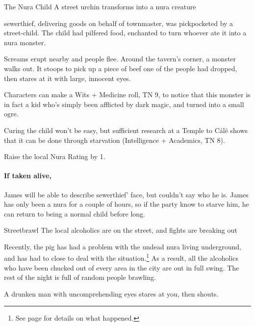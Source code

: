 \begin{multicols}{2}
{\N The Nura Child}%
{A street urchin transforms into a nura creature}%

\Gls{sewerthief}, delivering goods on behalf of \gls{townmaster}, was pickpocketed by a street-child.
The child had pilfered food, enchanted to turn whoever ate it into a nura monster.

\begin{boxtext}

	Screams erupt nearby and people flee.
	Around the tavern's corner, a monster walks out.
	It stoops to pick up a piece of beef one of the people had dropped, then stares at it with large, innocent eyes.

\end{boxtext}

Characters can make a Wits + Medicine roll, TN 9, to notice that this monster is in fact a kid who's simply been afflicted by dark magic, and turned into a small ogre.

Curing the child won't be easy, but sufficient research at a Temple to C\'{a}l\"{e} shows that it can be done through starvation (Intelligence + Academics, TN 8).

Raise the local Nura Rating by 1.


\paragraph{If taken alive,}
James will be able to describe \gls{sewerthief}' face, but couldn't say who he is.
James has only been a nura for a couple of hours, so if the party know to starve him, he can return to being a normal child before long.

{\N Streetbrawl}%
{The local alcoholics are on the street, and fights are breaking out}%

Recently, the \gls{pig} has had a problem with the undead nura living underground, and has had to close to deal with the situation.\footnote{See page \pageref{pig_pantry} for details on what happened.}
As a result, all the alcoholics who have been chucked out of every area in the city are out in full swing.
The rest of the night is full of random people brawling.

\begin{boxtext}

A drunken man with uncomprehending eyes stares at you, then shouts.


\end{boxtext}
\end{multicols}
